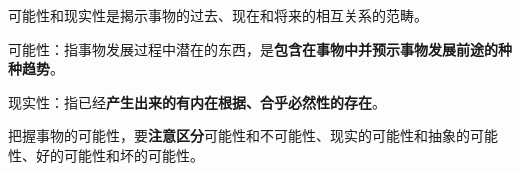 可能性和现实性是揭示事物的过去、现在和将来的相互关系的范畴。

{可能性：指事物发展过程中潜在的东西，是\textbf{包含在事物中并预示事物发展前途的种种趋势}。}

{现实性：指已经\textbf{产生出来的有内在根据、合乎必然性的存在}。}

{把握事物的可能性，要\textbf{{注意区分}}可能性和不可能性、现实的可能性和抽象的可能性、好的可能性和坏的可能性。}
